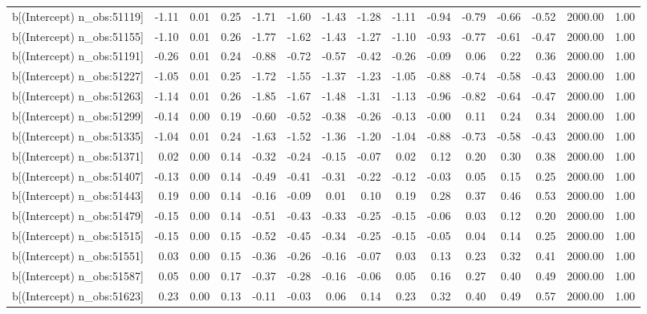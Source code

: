 \begin{table}[ht]
\begin{tabular}{rrrrrrrrrrrrrrr}
  b[(Intercept) n\_obs:51119] & -1.11 & 0.01 & 0.25 & -1.71 & -1.60 & -1.43 & -1.28 & -1.11 & -0.94 & -0.79 & -0.66 & -0.52 & 2000.00 & 1.00 \\ 
  b[(Intercept) n\_obs:51155] & -1.10 & 0.01 & 0.26 & -1.77 & -1.62 & -1.43 & -1.27 & -1.10 & -0.93 & -0.77 & -0.61 & -0.47 & 2000.00 & 1.00 \\ 
  b[(Intercept) n\_obs:51191] & -0.26 & 0.01 & 0.24 & -0.88 & -0.72 & -0.57 & -0.42 & -0.26 & -0.09 & 0.06 & 0.22 & 0.36 & 2000.00 & 1.00 \\ 
  b[(Intercept) n\_obs:51227] & -1.05 & 0.01 & 0.25 & -1.72 & -1.55 & -1.37 & -1.23 & -1.05 & -0.88 & -0.74 & -0.58 & -0.43 & 2000.00 & 1.00 \\ 
  b[(Intercept) n\_obs:51263] & -1.14 & 0.01 & 0.26 & -1.85 & -1.67 & -1.48 & -1.31 & -1.13 & -0.96 & -0.82 & -0.64 & -0.47 & 2000.00 & 1.00 \\ 
  b[(Intercept) n\_obs:51299] & -0.14 & 0.00 & 0.19 & -0.60 & -0.52 & -0.38 & -0.26 & -0.13 & -0.00 & 0.11 & 0.24 & 0.34 & 2000.00 & 1.00 \\ 
  b[(Intercept) n\_obs:51335] & -1.04 & 0.01 & 0.24 & -1.63 & -1.52 & -1.36 & -1.20 & -1.04 & -0.88 & -0.73 & -0.58 & -0.43 & 2000.00 & 1.00 \\ 
  b[(Intercept) n\_obs:51371] & 0.02 & 0.00 & 0.14 & -0.32 & -0.24 & -0.15 & -0.07 & 0.02 & 0.12 & 0.20 & 0.30 & 0.38 & 2000.00 & 1.00 \\ 
  b[(Intercept) n\_obs:51407] & -0.13 & 0.00 & 0.14 & -0.49 & -0.41 & -0.31 & -0.22 & -0.12 & -0.03 & 0.05 & 0.15 & 0.25 & 2000.00 & 1.00 \\ 
  b[(Intercept) n\_obs:51443] & 0.19 & 0.00 & 0.14 & -0.16 & -0.09 & 0.01 & 0.10 & 0.19 & 0.28 & 0.37 & 0.46 & 0.53 & 2000.00 & 1.00 \\ 
  b[(Intercept) n\_obs:51479] & -0.15 & 0.00 & 0.14 & -0.51 & -0.43 & -0.33 & -0.25 & -0.15 & -0.06 & 0.03 & 0.12 & 0.20 & 2000.00 & 1.00 \\ 
  b[(Intercept) n\_obs:51515] & -0.15 & 0.00 & 0.15 & -0.52 & -0.45 & -0.34 & -0.25 & -0.15 & -0.05 & 0.04 & 0.14 & 0.25 & 2000.00 & 1.00 \\ 
  b[(Intercept) n\_obs:51551] & 0.03 & 0.00 & 0.15 & -0.36 & -0.26 & -0.16 & -0.07 & 0.03 & 0.13 & 0.23 & 0.32 & 0.41 & 2000.00 & 1.00 \\ 
  b[(Intercept) n\_obs:51587] & 0.05 & 0.00 & 0.17 & -0.37 & -0.28 & -0.16 & -0.06 & 0.05 & 0.16 & 0.27 & 0.40 & 0.49 & 2000.00 & 1.00 \\ 
  b[(Intercept) n\_obs:51623] & 0.23 & 0.00 & 0.13 & -0.11 & -0.03 & 0.06 & 0.14 & 0.23 & 0.32 & 0.40 & 0.49 & 0.57 & 2000.00 & 1.00 \\ 

\end{tabular}
\end{table}
